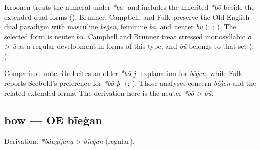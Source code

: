 \documentclass[
  british,
  a4paper,
]{article}
\begin{document}
Kroonen treats the numeral under \emph{*ba-} and includes the inherited
\emph{*bō} beside the extended dual forms
(). Brunner, Campbell, and
Fulk preserve the Old English dual paradigm with masculine \emph{bēġen},
feminine \emph{bā}, and neuter \emph{bū}
(;
;
). The selected form is neuter
\emph{bū}. Campbell and Brunner treat stressed monosyllabic \emph{ō
\textgreater{} ū} as a regular development in forms of this type, and
\emph{bū} belongs to that set (; ).

Comparison note. Orel cites an older \emph{*bō-j-} explanation for
\emph{bēġen}, while Fulk reports Seebold's preference for \emph{*bō-þ-}
(; ). Those analyses concern \emph{bēġen} and the related
extended forms. The derivation here is the neuter \emph{*bō
\textgreater{} bū}.

\subsection{bow --- OE bīeġan}\label{bow-oe-bux12beux121an}

Derivation: \emph{*báugijaną} \textgreater{} \emph{bīeġan} (regular).

\begingroup
\setlength{\fboxsep}{6pt}
\end{document}
